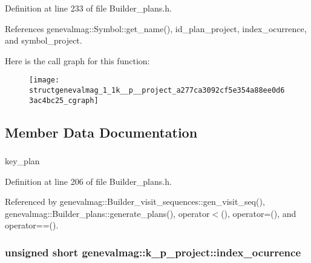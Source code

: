Definition at line 233 of file Builder\_\-plans.h.



References genevalmag::Symbol::get\_\-name(), id\_\-plan\_\-project, index\_\-ocurrence, and symbol\_\-project.



Here is the call graph for this function:\nopagebreak
\begin{figure}[H]
\begin{center}
\leavevmode
\texttt{[image: structgenevalmag\_1\_1k\_\_p\_\_project\_a277ca3092cf5e354a88ee0d63ac4bc25\_cgraph]}
\end{center}
\end{figure}




\subsection{Member Data Documentation}
\hypertarget{structgenevalmag_1_1k__p__project_afc065645098439a308c5ca879e5e5a51}{
\subsubsection[{id\_\-plan\_\-project}]{}}
\label{structgenevalmag_1_1k__p__project_afc065645098439a308c5ca879e5e5a51}


key\_\-plan 



Definition at line 206 of file Builder\_\-plans.h.



Referenced by genevalmag::Builder\_\-visit\_\-sequences::gen\_\-visit\_\-seq(), genevalmag::Builder\_\-plans::generate\_\-plans(), operator$<$(), operator=(), and operator==().

\hypertarget{structgenevalmag_1_1k__p__project_a42b98a1d22cb7215bdc7a0432f94cbcc}{
\subsubsection[{index\_\-ocurrence}]{\setlength{\rightskip}{0pt plus 5cm}unsigned short {\bf genevalmag::k\_\-p\_\-project::index\_\-ocurrence}}}
\label{structgenevalmag_1_1k__p__project_a42b98a1d22cb7215bdc7a0432f94cbcc}


